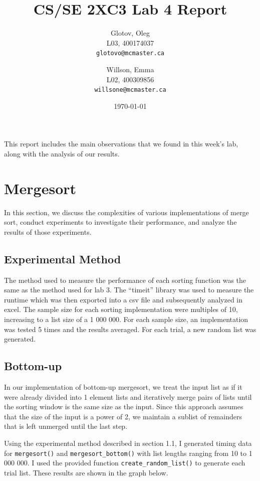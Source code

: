 \documentclass[12pt]{article}
\title{CS/SE 2XC3 Lab 4 Report}
\author{
  Glotov, Oleg\\ L03, 400174037\\
  \texttt{glotovo@mcmaster.ca}
  \and
  Willson, Emma\\ L02, 400309856\\
  \texttt{willsone@mcmaster.ca}
  }
\date{\today}
\begin{document}
\maketitle

This report includes the main observations that we found in this week's lab, along with the analysis of our results.

\newpage 
\section{Mergesort}
In this section, we discuss the complexities of various implementations of merge sort, conduct experiments to investigate their performance, and analyze the results of those experiments.
\subsection{Experimental Method}
The method used to measure the performance of each sorting function was the same as the method used for lab 3. The “timeit” library was used to measure the runtime which was then exported into a csv file and subsequently analyzed in excel. The sample size for each sorting implementation were multiples of 10, increasing to a list size of a 1 000 000. For each sample size, an implementation was tested 5 times and the results averaged. For each trial, a new random list was generated. 

\subsection{Bottom-up}
In our implementation of bottom-up mergesort, we treat the input list as if it were already divided into 1 element lists and iteratively merge pairs of lists until the sorting window is the same size as the input. Since this approach assumes that the size of the input is a power of 2, we maintain a sublist of remainders that is left unmerged until the last step. 

Using the experimental method described in section 1.1, I generated timing data for  \verb+mergesort()+ and \verb+mergesort_bottom()+ with list lengths ranging from 10 to 1 000 000. I used the provided function \verb+create_random_list()+ to generate each trial list. These results are shown in the graph below. 
\end{document}
